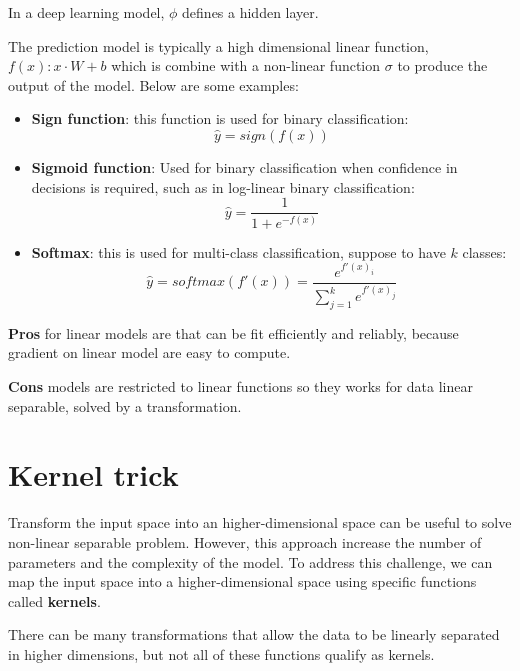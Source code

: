 \begin{note}
    In a deep learning model, $\phi$ defines a hidden layer.
\end{note}

The prediction model is typically a high dimensional linear function, $f(x): x \cdot W + b$
which is combine with a non-linear function $\sigma$ to produce the output of the
model. Below are some examples:
\begin{itemize}
    \item \textbf{Sign function}: this function is used for binary classification:
          \begin{equation}
              \hat{y} = sign(f(x))
          \end{equation}
    \item \textbf{Sigmoid function}: Used for binary classification when confidence
          in decisions is required, such as in log-linear binary classification:
          \begin{equation}
              \hat{y} = \frac{1}{1+e^{-f(x)}}
          \end{equation}
    \item \textbf{Softmax}: this is used for multi-class classification, suppose
          to have $k$ classes:
          \begin{equation}
              \hat{y} = softmax(f'(x)) = \frac{e^{f'(x)_i}}{\sum_{j=1}^k e^{f'(x)_j}}
          \end{equation}
\end{itemize}

\textbf{Pros} for linear models are that can be fit efficiently and reliably, because
gradient on linear model are easy to compute.

\textbf{Cons} models are restricted to linear functions so they works for data linear
separable, solved by a transformation.
\section{Kernel trick}
Transform the input space into an higher-dimensional space can be useful to solve
non-linear separable problem. However, this approach increase the number of
parameters and the complexity of the model. To address this challenge, we can map
the input space into a higher-dimensional space using specific functions called
\textbf{kernels}.

\begin{note}
    There can be many transformations that allow the data to be linearly separated
    in higher dimensions, but not all of these functions qualify as kernels.
\end{note}

